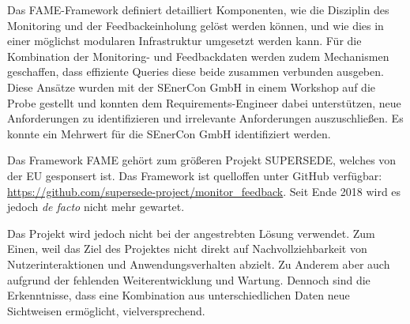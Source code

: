 Das FAME-Framework definiert detailliert Komponenten, wie die Disziplin des Monitoring und der Feedbackeinholung gelöst werden können, und wie dies in einer möglichst modularen Infrastruktur umgesetzt werden kann. Für die Kombination der Monitoring- und Feedbackdaten werden zudem Mechanismen geschaffen, dass effiziente Queries diese beide zusammen verbunden ausgeben. Diese Ansätze wurden mit der SEnerCon GmbH in einem Workshop auf die Probe gestellt und konnten dem Requirements-Engineer dabei unterstützen, neue Anforderungen zu identifizieren und irrelevante Anforderungen auszuschließen. Es konnte ein Mehrwert für die SEnerCon GmbH identifiziert werden.

Das Framework FAME gehört zum größeren Projekt SUPERSEDE, welches von der EU gesponsert ist. Das Framework ist quelloffen unter GitHub verfügbar: \url{https://github.com/supersede-project/monitor_feedback}. Seit Ende 2018 wird es jedoch \textit{de facto} nicht mehr gewartet.

Das Projekt wird jedoch nicht bei der angestrebten Lösung verwendet. Zum Einen, weil das Ziel des Projektes nicht direkt auf Nachvollziehbarkeit von Nutzerinteraktionen und Anwendungsverhalten abzielt. Zu Anderem aber auch aufgrund der fehlenden Weiterentwicklung und Wartung. Dennoch sind die Erkenntnisse, dass eine Kombination aus unterschiedlichen Daten neue Sichtweisen ermöglicht, vielversprechend.
